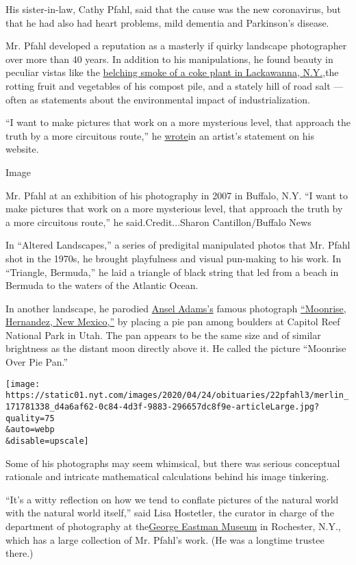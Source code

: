 His sister-in-law, Cathy Pfahl, said that the cause was the new
coronavirus, but that he had also had heart problems, mild dementia and
Parkinson's disease.

Mr. Pfahl developed a reputation as a masterly if quirky landscape
photographer over more than 40 years. In addition to his manipulations,
he found beauty in peculiar vistas like the
\href{https://johnpfahl.com/pages/smoke/S1.html}{belching smoke of a
coke plant in Lackawanna, N.Y.,}the rotting fruit and vegetables of his
compost pile, and a stately hill of road salt --- often as statements
about the environmental impact of industrialization.

``I want to make pictures that work on a more mysterious level, that
approach the truth by a more circuitous route,'' he
\href{https://johnpfahl.com/pages/extras/ArtStatement.html}{wrote}in an
artist's statement on his website.

Image

Mr. Pfahl at an exhibition of his photography in 2007 in Buffalo, N.Y.
``I want to make pictures that work on a more mysterious level, that
approach the truth by a more circuitous route,'' he said.Credit...Sharon
Cantillon/Buffalo News

In ``Altered Landscapes,'' a series of predigital manipulated photos
that Mr. Pfahl shot in the 1970s, he brought playfulness and visual
pun-making to his work. In ``Triangle, Bermuda,'' he laid a triangle of
black string that led from a beach in Bermuda to the waters of the
Atlantic Ocean.

In another landscape, he parodied
\href{https://www.anseladams.com/}{Ansel Adams's} famous photograph
\href{https://www.moma.org/collection/works/53904}{``Moonrise,
Hernandez, New Mexico,''} by placing a pie pan among boulders at Capitol
Reef National Park in Utah. The pan appears to be the same size and of
similar brightness as the distant moon directly above it. He called the
picture ``Moonrise Over Pie Pan.''

\texttt{[image: https://static01.nyt.com/images/2020/04/24/obituaries/22pfahl3/merlin\_171781338\_d4a6af62-0c84-4d3f-9883-296657dc8f9e-articleLarge.jpg?quality=75\\\&auto=webp\\\&disable=upscale]}

Some of his photographs may seem whimsical, but there was serious
conceptual rationale and intricate mathematical calculations behind his
image tinkering.

``It's a witty reflection on how we tend to conflate pictures of the
natural world with the natural world itself,'' said Lisa Hostetler, the
curator in charge of the department of photography at
the\href{https://www.eastman.org/}{George Eastman Museum} in Rochester,
N.Y., which has a large collection of Mr. Pfahl's work. (He was a
longtime trustee there.)

